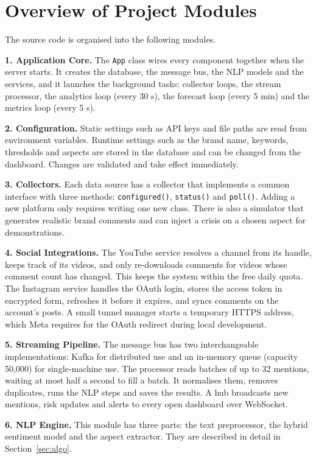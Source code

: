 \documentclass[12pt,a4paper]{report}
\begin{document}
\section{Overview of Project Modules}

The source code is organised into the following modules.

\textbf{1. Application Core.} The \texttt{App} class wires every component together when the server starts. It creates the database, the message bus, the NLP models and the services, and it launches the background tasks: collector loops, the stream processor, the analytics loop (every 30 s), the forecast loop (every 5 min) and the metrics loop (every 5 s).

\textbf{2. Configuration.} Static settings such as API keys and file paths are read from environment variables. Runtime settings such as the brand name, keywords, thresholds and aspects are stored in the database and can be changed from the dashboard. Changes are validated and take effect immediately.

\textbf{3. Collectors.} Each data source has a collector that implements a common interface with three methods: \texttt{configured()}, \texttt{status()} and \texttt{poll()}. Adding a new platform only requires writing one new class. There is also a simulator that generates realistic brand comments and can inject a crisis on a chosen aspect for demonstrations.

\textbf{4. Social Integrations.} The YouTube service resolves a channel from its handle, keeps track of its videos, and only re-downloads comments for videos whose comment count has changed. This keeps the system within the free daily quota. The Instagram service handles the OAuth login, stores the access token in encrypted form, refreshes it before it expires, and syncs comments on the account's posts. A small tunnel manager starts a temporary HTTPS address, which Meta requires for the OAuth redirect during local development.

\textbf{5. Streaming Pipeline.} The message bus has two interchangeable implementations: Kafka for distributed use and an in-memory queue (capacity 50,000) for single-machine use. The processor reads batches of up to 32 mentions, waiting at most half a second to fill a batch. It normalises them, removes duplicates, runs the NLP steps and saves the results. A hub broadcasts new mentions, risk updates and alerts to every open dashboard over WebSocket.

\textbf{6. NLP Engine.} This module has three parts: the text preprocessor, the hybrid sentiment model and the aspect extractor. They are described in detail in Section~\ref{sec:algo}.
\end{document}
